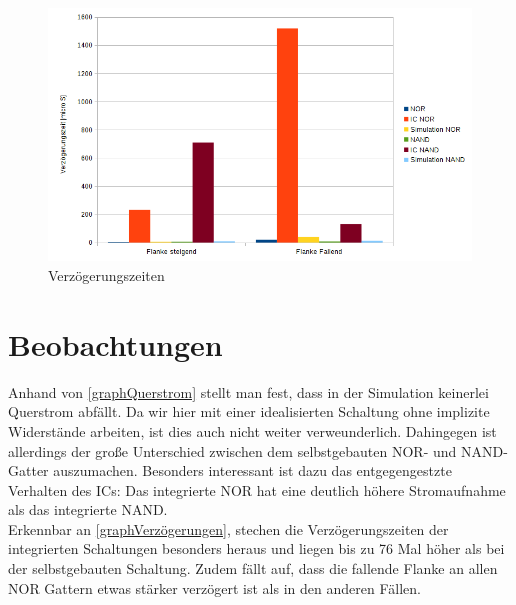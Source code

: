 \documentclass[11pt, a4paper]{article}
\begin{document}
\begin{figure}[H]
    \centering
    \includegraphics[width=\linewidth]{images/verzoegerungen.png}
    \caption{Verzögerungszeiten}
    \label{graphVerzögerungen}
\end{figure}

\section*{Beobachtungen}
Anhand von \autoref{graphQuerstrom} stellt man fest, dass in der Simulation keinerlei Querstrom abfällt. Da wir hier mit einer idealisierten Schaltung ohne implizite Widerstände arbeiten, ist dies auch nicht weiter verweunderlich.
Dahingegen ist allerdings der große Unterschied zwischen dem selbstgebauten NOR- und NAND-Gatter auszumachen. Besonders interessant ist dazu das entgegengestzte Verhalten des ICs: Das integrierte NOR hat eine deutlich höhere Stromaufnahme als das integrierte NAND.
\\
Erkennbar an \autoref{graphVerzögerungen}, stechen die Verzögerungszeiten der integrierten Schaltungen besonders heraus und liegen bis zu 76 Mal höher als bei der selbstgebauten Schaltung. Zudem fällt auf, dass die fallende Flanke an allen NOR Gattern etwas stärker verzögert ist als in den anderen Fällen.
\end{document}
